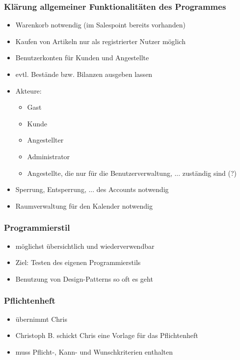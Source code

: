 \documentclass[12pt,a4paper]{article}
\begin{document}
\subsubsection*{Klärung allgemeiner Funktionalitäten des Programmes}
\begin{itemize}
\item Warenkorb notwendig (im Salespoint bereits vorhanden)
\item Kaufen von Artikeln nur als registrierter Nutzer möglich
\item Benutzerkonten für Kunden und Angestellte
\item evtl. Bestände bzw. Bilanzen ausgeben lassen
\item Akteure:
\begin{itemize}
\item Gast
\item Kunde
\item Angestellter
\item Administrator
\item Angestellte, die nur für die Benutzerverwaltung, ... zuständig sind (?)
\end{itemize}
\item Sperrung, Entsperrung, ... des Accounts notwendig
\item Raumverwaltung für den Kalender notwendig
\end{itemize}

\subsubsection*{Programmierstil}
\begin{itemize}
\item möglichst übersichtlich und wiederverwendbar
\item Ziel: Testen des eigenen Programmierstils
\item Benutzung von Design-Patterns so oft es geht  
\end{itemize}

\subsubsection*{Pflichtenheft}
\begin{itemize}
\item übernimmt Chris
\item Christoph B. schickt Chris eine Vorlage für das Pflichtenheft
\item muss Pflicht-, Kann- und Wunschkriterien enthalten
\end{itemize}
\end{document}
